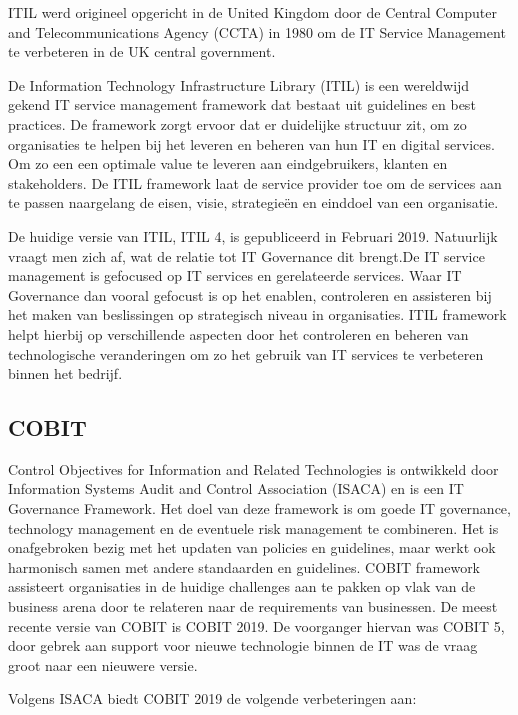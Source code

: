 ITIL werd origineel opgericht in de United Kingdom door de Central Computer and Telecommunications Agency (CCTA) in 1980 om de IT Service Management te verbeteren in de UK central government. \autocite{Potgieter2005}


De Information Technology Infrastructure Library (ITIL) is een wereldwijd gekend IT service management framework dat bestaat uit guidelines en best practices.  \autocite{Potgieter2005}
De framework zorgt ervoor dat er duidelijke structuur zit, om zo organisaties te helpen bij het leveren en beheren van hun IT en digital services. Om zo een een optimale value te leveren aan eindgebruikers, klanten en stakeholders. 
De ITIL framework laat de service provider toe om de services aan te passen naargelang de eisen, visie, strategieën en einddoel van een organisatie. \autocite{Mikkola2021}

De huidige versie van ITIL, ITIL 4, is gepubliceerd in Februari 2019. \autocite{Mikkola2021}
Natuurlijk vraagt men zich af, wat de relatie tot IT Governance dit brengt.De IT service management is gefocused op IT services en gerelateerde services.
Waar IT Governance dan vooral gefocust is op het enablen, controleren en assisteren bij het maken van beslissingen op strategisch niveau in organisaties. ITIL framework helpt hierbij op verschillende aspecten door het controleren en beheren van technologische veranderingen om zo het gebruik van IT services te verbeteren binnen het bedrijf. \autocite{Mikkola2021}

\subsection{COBIT}
Control Objectives for Information and Related Technologies is ontwikkeld door Information Systems Audit and Control Association (ISACA) en is een IT Governance Framework. Het doel van deze framework is om goede IT governance, technology management en de eventuele risk management te combineren. \autocite{Khther2013} 
Het is onafgebroken bezig met het updaten van policies en guidelines, maar werkt ook harmonisch samen met andere standaarden en guidelines. COBIT framework assisteert organisaties in de huidige challenges aan te pakken op vlak van de business arena door te relateren naar de requirements van businessen.
De meest recente versie van COBIT is COBIT 2019. De voorganger hiervan was COBIT 5, door gebrek aan support voor nieuwe technologie binnen de IT was de vraag groot naar een nieuwere versie.

Volgens ISACA biedt COBIT 2019 de volgende verbeteringen aan:

